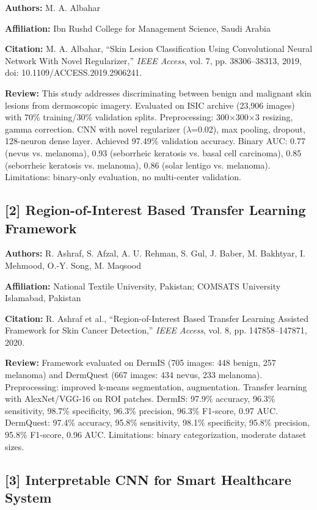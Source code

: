 \documentclass[10pt,twocolumn]{article}
\begin{document}
\textbf{Authors:} M. A. Albahar

\textbf{Affiliation:} Ibn Rushd College for Management Science, Saudi Arabia

\textbf{Citation:} M. A. Albahar, ``Skin Lesion Classification Using Convolutional Neural Network With Novel Regularizer,'' \textit{IEEE Access}, vol. 7, pp. 38306--38313, 2019, doi: 10.1109/ACCESS.2019.2906241.

\textbf{Review:} This study addresses discriminating between benign and malignant skin lesions from dermoscopic imagery. Evaluated on ISIC archive (23,906 images) with 70\% training/30\% validation splits. Preprocessing: 300×300×3 resizing, gamma correction. CNN with novel regularizer ($\lambda$=0.02), max pooling, dropout, 128-neuron dense layer. Achieved 97.49\% validation accuracy. Binary AUC: 0.77 (nevus vs. melanoma), 0.93 (seborrheic keratosis vs. basal cell carcinoma), 0.85 (seborrheic keratosis vs. melanoma), 0.86 (solar lentigo vs. melanoma). Limitations: binary-only evaluation, no multi-center validation.

\subsection*{[2] Region-of-Interest Based Transfer Learning Framework}

\textbf{Authors:} R. Ashraf, S. Afzal, A. U. Rehman, S. Gul, J. Baber, M. Bakhtyar, I. Mehmood, O.-Y. Song, M. Maqsood

\textbf{Affiliation:} National Textile University, Pakistan; COMSATS University Islamabad, Pakistan

\textbf{Citation:} R. Ashraf et al., ``Region-of-Interest Based Transfer Learning Assisted Framework for Skin Cancer Detection,'' \textit{IEEE Access}, vol. 8, pp. 147858--147871, 2020.

\textbf{Review:} Framework evaluated on DermIS (705 images: 448 benign, 257 melanoma) and DermQuest (667 images: 434 nevus, 233 melanoma). Preprocessing: improved k-means segmentation, augmentation. Transfer learning with AlexNet/VGG-16 on ROI patches. DermIS: 97.9\% accuracy, 96.3\% sensitivity, 98.7\% specificity, 96.3\% precision, 96.3\% F1-score, 0.97 AUC. DermQuest: 97.4\% accuracy, 95.8\% sensitivity, 98.1\% specificity, 95.8\% precision, 95.8\% F1-score, 0.96 AUC. Limitations: binary categorization, moderate dataset sizes.

\subsection*{[3] Interpretable CNN for Smart Healthcare System}
\end{document}
